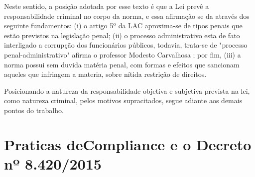 Neste sentido, a posição adotada por esse texto é que a Lei prevê a responsabilidade criminal no corpo da norma, e essa afirmação se da através dos seguinte fundamentos: (i) o artigo 5º da LAC aproxima-se de tipos penais que estão previstos na legislação penal; (ii) o processo administrativo esta de fato interligado a corrupção dos funcionários públicos, todavia, trata-se de "processo penal-administrativo" afirma o professor Modesto Carvalhosa \cite{modestocarvalhosa}; por fim, (iii) a norma possui sem duvida matéria penal, com formas e efeitos que sancionam aqueles que infringem a materia, sobre nítida restrição de direitos. 

Posicionando a natureza da responsabilidade objetiva e subjetiva prevista na lei, como natureza criminal, pelos motivos supracitados, segue adiante aos demais pontos do trabalho. 

\chapter{Praticas deCompliance e o Decreto nº 8.420/2015}

